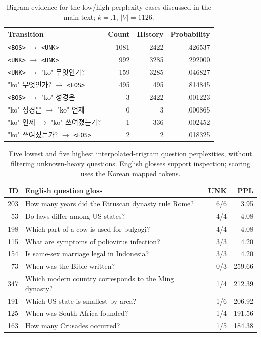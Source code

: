 \documentclass[11pt]{article}
\newcommand{\KO}[1]{{\koreanfont\XeTeXlinebreaklocale "ko" #1}}
\newcommand{\unk}{\texttt{<UNK>}}
\newcommand{\bos}{\texttt{<BOS>}}
\newcommand{\eos}{\texttt{<EOS>}}
\begin{document}
\begin{table}[H]
\centering\small\setlength{\tabcolsep}{3pt}
\begin{tabular}{lrrr}
\toprule
Transition & Count & History & Probability\\
\midrule
\bos{} $\to$ \unk{} & 1081 & 2422 & .426537\\
\unk{} $\to$ \unk{} & 992 & 3285 & .292000\\
\unk{} $\to$ \KO{무엇인가?} & 159 & 3285 & .046827\\
\KO{무엇인가?} $\to$ \eos{} & 495 & 495 & .814845\\
\bos{} $\to$ \KO{성경은} & 3 & 2422 & .001223\\
\KO{성경은} $\to$ \KO{언제} & 0 & 3 & .000865\\
\KO{언제} $\to$ \KO{쓰여졌는가?} & 1 & 336 & .002452\\
\KO{쓰여졌는가?} $\to$ \eos{} & 2 & 2 & .018325\\
\bottomrule
\end{tabular}
\caption{Bigram evidence for the low/high-perplexity cases discussed in the main text; $k=.1$, $|V|=1126$.}
\end{table}

\begin{table}[H]
\centering\small\setlength{\tabcolsep}{3pt}
\begin{tabular}{r p{4.1cm} r r}
\toprule
ID & English question gloss & UNK & PPL\\
\midrule
203 & How many years did the Etruscan dynasty rule Rome? & 6/6 & 3.95\\
53 & Do laws differ among US states? & 4/4 & 4.08\\
198 & Which part of a cow is used for bulgogi? & 4/4 & 4.08\\
115 & What are symptoms of poliovirus infection? & 3/3 & 4.20\\
154 & Is same-sex marriage legal in Indonesia? & 3/3 & 4.20\\
\midrule
73 & When was the Bible written? & 0/3 & 259.66\\
347 & Which modern country corresponds to the Ming dynasty? & 1/4 & 212.39\\
191 & Which US state is smallest by area? & 1/6 & 206.92\\
125 & When was South Africa founded? & 1/4 & 191.56\\
163 & How many Crusades occurred? & 1/5 & 184.38\\
\bottomrule
\end{tabular}
\caption{Five lowest and five highest interpolated-trigram question perplexities, without filtering unknown-heavy questions. English glosses support inspection; scoring uses the Korean mapped tokens.}
\end{table}
\end{document}
